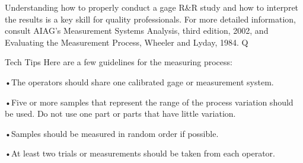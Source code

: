 Understanding how to properly conduct a gage R&R study and how to interpret the results is a key skill for quality professionals. For more detailed information, consult AIAG’s Measurement Systems Analysis, third edition, 2002, and Evaluating the Measurement Process, Wheeler and Lyday, 1984. Q


Tech Tips
Here are a few guidelines for the measuring process:

 •The operators should share one calibrated gage or measurement system.

 
•Five or more samples that represent the range of the process variation should be used. Do not use one part or parts that have little variation. 


•Samples should be measured in random order if possible. 


•At least two trials or measurements should be taken from each operator. 

